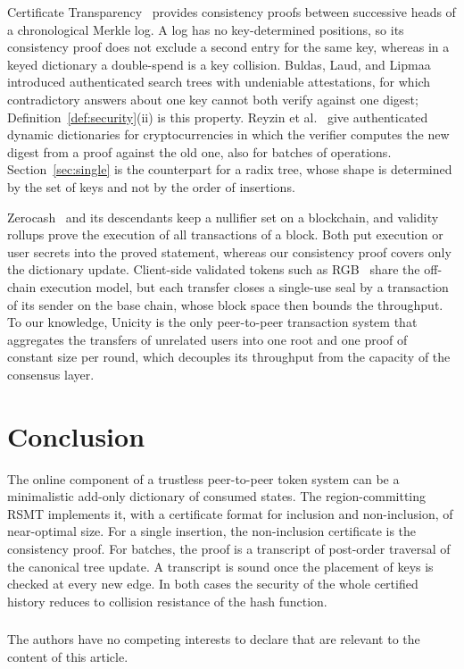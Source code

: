 \documentclass[runningheads]{llncs}
\begin{document}
Certificate Transparency~\cite{rfc6962} provides consistency proofs between successive heads of a chronological Merkle log. A log has no key-determined positions, so its consistency proof does not exclude a second entry for the same key, whereas in a keyed dictionary a double-spend is a key collision. Buldas, Laud, and Lipmaa~\cite{buldas2000} introduced authenticated search trees with undeniable attestations, for which contradictory answers about one key cannot both verify against one digest; Definition~\ref{def:security}(ii) is this property. Reyzin et al.~\cite{reyzin2017} give authenticated dynamic dictionaries for cryptocurrencies in which the verifier computes the new digest from a proof against the old one, also for batches of operations. Section~\ref{sec:single} is the counterpart for a radix tree, whose shape is determined by the set of keys and not by the order of insertions.

Zerocash~\cite{zerocash} and its descendants keep a nullifier set on a blockchain, and validity rollups prove the execution of all transactions of a block. Both put execution or user secrets into the proved statement, whereas our consistency proof covers only the dictionary update. Client-side validated tokens such as RGB~\cite{rgb} share the off-chain execution model, but each transfer closes a single-use seal by a transaction of its sender on the base chain, whose block space then bounds the throughput. To our knowledge, Unicity is the only peer-to-peer transaction system that aggregates the transfers of unrelated users into one root and one proof of constant size per round, which decouples its throughput from the capacity of the consensus layer.


\section{Conclusion}\label{sec:conclusion}

The online component of a trustless peer-to-peer token system can be a minimalistic add-only dictionary of consumed states. The region-committing RSMT implements it, with a certificate format for inclusion and non-inclusion, of near-optimal size. For a single insertion, the non-inclusion certificate is the consistency proof. For batches, the proof is a transcript of post-order traversal of the canonical tree update. A transcript is sound once the placement of keys is checked at every new edge. In both cases the security of the whole certified history reduces to collision resistance of the hash function.

\begin{credits}
\subsubsection{\discintname}
The authors have no competing interests to declare that are relevant to the content of this article.
\end{credits}



\end{document}
